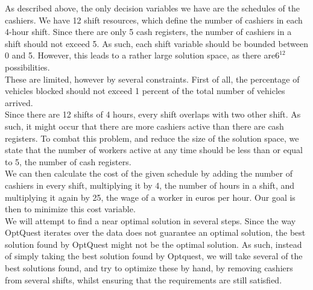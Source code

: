 As described above, the only decision variables we have are the schedules of the cashiers.
We have 12 shift resources, which define the number of cashiers in each 4-hour shift.
Since there are only 5 cash registers, the number of cashiers in a shift should not exceed 5.
As such, each shift variable should be bounded between 0 and 5.
However, this leads to a rather large solution space, as there are$6^{12}$ possibilities. \\
These are limited, however by several constraints.
First of all, the percentage of vehicles blocked should not exceed 1 percent of the total number of vehicles arrived. \\
Since there are 12 shifts of 4 hours, every shift overlaps with two other shift.
As such, it might occur that there are more cashiers active than there are cash registers.
To combat this problem, and reduce the size of the solution space, we state that the number of workers active at any time should be less than or equal to 5, the number of cash registers. \\
We can then calculate the cost of the given schedule by adding the number of cashiers in every shift, multiplying it by 4, the number of hours in a shift, and multiplying it again by 25, the wage of a worker in euros per hour.
Our goal is then to minimize this cost variable. \\

We will attempt to find a near optimal solution in several steps.
Since the way OptQuest iterates over the data does not guarantee an optimal solution, the best solution found by OptQuest might not be the optimal solution.
As such, instead of simply taking the best solution found by Optquest, we will take several of the best solutions found, and try to optimize these by hand, by removing cashiers from several shifts, whilst ensuring that the requirements are still satisfied. 